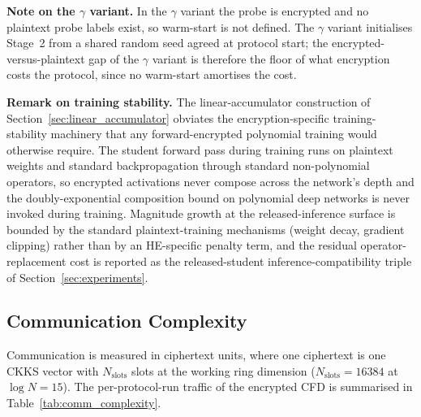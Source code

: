 \par\noindent\textbf{Note on the $\gamma$ variant.} In the $\gamma$ variant the probe is encrypted and no plaintext probe labels exist, so warm-start is not defined. The $\gamma$ variant initialises Stage~2 from a shared random seed agreed at protocol start; the encrypted-versus-plaintext gap of the $\gamma$ variant is therefore the floor of what encryption costs the protocol, since no warm-start amortises the cost.

\par\noindent\textbf{Remark on training stability.} The linear-accumulator construction of Section~\ref{sec:linear_accumulator} obviates the encryption-specific training-stability machinery that any forward-encrypted polynomial training would otherwise require. The student forward pass during training runs on plaintext weights and standard backpropagation through standard non-polynomial operators, so encrypted activations never compose across the network's depth and the doubly-exponential composition bound on polynomial deep networks is never invoked during training. Magnitude growth at the released-inference surface is bounded by the standard plaintext-training mechanisms (weight decay, gradient clipping) rather than by an HE-specific penalty term, and the residual operator-replacement cost is reported as the released-student inference-compatibility triple of Section~\ref{sec:experiments}.


\subsection{Communication Complexity}
\label{sec:complexity}

Communication is measured in ciphertext units, where one ciphertext is one CKKS vector with $N_{\text{slots}}$ slots at the working ring dimension ($N_{\text{slots}} = 16384$ at $\log N = 15$). The per-protocol-run traffic of the encrypted CFD is summarised in Table~\ref{tab:comm_complexity}.

